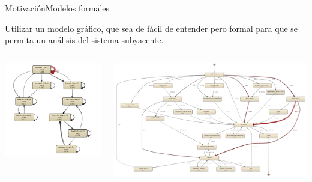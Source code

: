 \documentclass[spanish,pdf]{beamer}
\begin{document}
\begin{frame}{Motivación}{Modelos formales}
  \vspace*{-0.5cm}
  \begin{minipage}[c][0.4\textheight][c]{\linewidth}
    Utilizar un modelo gráfico, que sea de fácil de entender
    pero formal para que se permita un análisis del sistema subyacente.
  \end{minipage}
  \begin{columns}
  \pause 
      \begin{minipage}[c][0.3\textheight][c]{\linewidth}
        \centering
        \includegraphics[width=1.2\linewidth]{img/ejemplo1.png}
      \end{minipage}
  \pause 
      \begin{minipage}[c][0.3\textheight][c]{\linewidth}
        \centering
        \includegraphics[width=1.2\linewidth]{img/ejemplo2.png}

\end{minipage}
\end{columns}
\end{frame}
\end{document}
